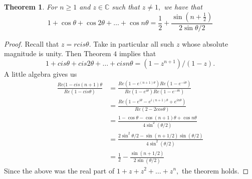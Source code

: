 \documentclass[letter]{article}
\newtheorem{theorem}{Theorem}
\newenvironment{menumerate}{%
  \edef\backupindent{\the\parindent}%
  \enumerate%
  \setlength{\parindent}{\backupindent}%
}{\endenumerate}
\begin{document}
\begin{menumerate}
        \begin{theorem}
            For $n\geq 1$ and $z \in \mathbb{C}$ such that $z \neq 1,$ we have that
            \begin{equation}
                1 +\cos \theta + \cos 2 \theta + \dots + \cos n \theta = \frac12 + \frac{\sin(n + \frac12)}{2 \sin \theta/2}
            \end{equation}
        \end{theorem}
        \begin{proof}
            Recall  that $z = r cis\theta.$ Take in particular all such $z$ whose absolute magnitude is unity. 
            Then Theorem $4$ implies that 
            \begin{equation}
                1 + cis \theta + cis 2 \theta + \dots + cis n \theta = (1-z^{n+1})/(1-z).
            \end{equation}
            A little algebra gives us 
            \begin{equation}
                \begin{aligned}
                    \frac{Re(1 - cis (n+1)\theta}{Re(1 - cis \theta)} &= \frac{Re(1 - e^{(n+1)\theta})Re(1-e^{-i\theta})}{Re(1 - e^{i\theta})Re(1-e^{-\theta i})} \\
                    &= \frac{Re(1 - e^{i\theta} - e^{i(n+1)\theta} + e^{in\theta})}{Re(2 - 2cos\theta)} \\
                    &= \frac{1 - \cos\theta - \cos (n+1)\theta + \cos n \theta}{4 \sin^2(\theta/2)} \\
                    &= \frac{2\sin^2{\theta/2}- \sin(n  + 1/2)\sin(\theta/2)}{4 \sin^2(\theta/2)} \\
                    &= \frac12 -\frac{ \sin(n  + 1/2)}{2\sin(\theta/2)} 
                \end{aligned}
            \end{equation}
            Since the above was the real part of $1 +z + z^2 + \dots + z^n,$ the theorem holds.
        \end{proof}
\end{menumerate}
\end{document}
